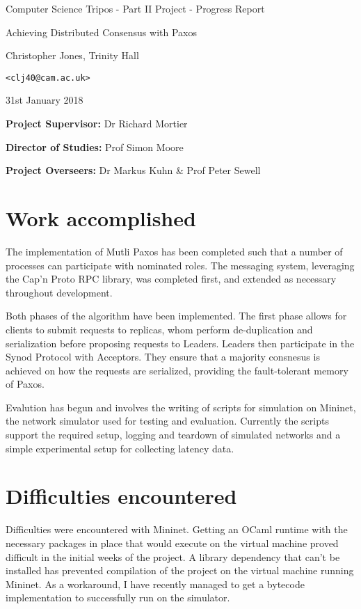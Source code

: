 \documentclass[11pt,a4]{report}
\begin{document}
\vfil

\centerline{\Large Computer Science Tripos - Part II Project - Progress Report}
\vspace{0.2in}
\centerline{\Large Achieving Distributed Consensus with Paxos}
\vspace{0.2in}
\centerline{\large Christopher Jones, Trinity Hall}
\vspace{0.1in}
\centerline{\large \texttt{<clj40@cam.ac.uk>}}
\vspace{0.1in}
\centerline{\large 31st January 2018}

\vspace{0.4in}

\noindent
{\bf Project Supervisor:} Dr Richard Mortier
\vspace{0.0in}

\noindent
{\bf Director of Studies:} Prof Simon Moore
\vspace{0.0in}
\noindent
 
\noindent
{\bf Project Overseers:} Dr Markus Kuhn \& Prof Peter Sewell


\section*{Work accomplished}


The implementation of Mutli Paxos has been completed such that a number of processes can participate with nominated roles. The messaging system, leveraging the Cap'n Proto RPC library, was completed first, and extended as necessary throughout development.

Both phases of the algorithm have been implemented. The first phase allows for clients to submit requests to replicas, whom perform de-duplication and serialization before proposing requests to Leaders. Leaders then participate in the Synod Protocol with Acceptors. They ensure that a majority consnesus is achieved on how the requests are serialized, providing the fault-tolerant memory of Paxos.

Evalution has begun and involves the writing of scripts for simulation on Mininet, the network simulator used for testing and evaluation. Currently the scripts support the required setup, logging and teardown of simulated networks and a simple experimental setup for collecting latency data.

\section*{Difficulties encountered}
Difficulties were encountered with Mininet. Getting an OCaml runtime with the necessary packages in place that would execute on the virtual machine proved difficult in the initial weeks of the project. A  library dependency that can't be installed has prevented compilation of the project on the virtual machine running Mininet. As a workaround, I have recently managed to get a bytecode implementation to successfully run on the simulator.
\end{document}
